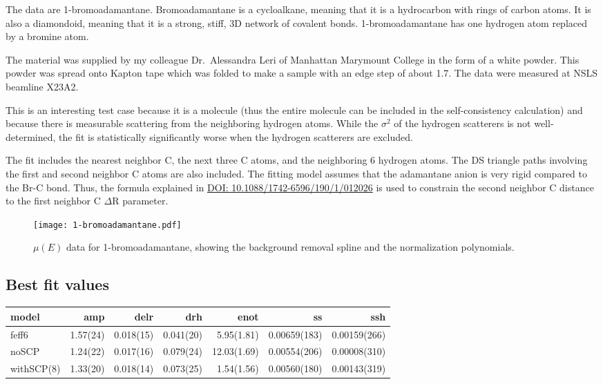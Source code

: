 \documentclass[11pt]{article}
\begin{document}
The data are 1-bromoadamantane. Bromoadamantane is a cycloalkane,
meaning that it is a hydrocarbon with rings of carbon atoms. It is
also a diamondoid, meaning that it is a strong, stiff, 3D network of
covalent bonds. 1-bromoadamantane has one hydrogen atom replaced by a
bromine atom.

The material was supplied by my colleague Dr.\ Alessandra Leri of
Manhattan Marymount College in the form of a white powder. This powder
was spread onto Kapton tape which was folded to make a sample with an
edge step of about 1.7. The data were measured at NSLS beamline X23A2.

This is an interesting test case because it is a molecule (thus the
entire molecule can be included in the self-consistency calculation)
and because there is measurable scattering from the neighboring
hydrogen atoms. While the $\sigma^2$ of the hydrogen scatterers is not
well-determined, the fit is statistically significantly worse when the
hydrogen scatterers are excluded.

The fit includes the nearest neighbor C, the next three C atoms, and
the neighboring 6 hydrogen atoms. The DS triangle paths involving the
first and second neighbor C atoms are also included. The fitting model
assumes that the adamantane anion is very rigid compared to the Br-C
bond. Thus, the formula explained in
\href{http://dx.doi.org/10.1088/1742-6596/190/1/012026}{DOI:
  10.1088/1742-6596/190/1/012026} is used to constrain the second
neighbor C distance to the first neighbor C $\Delta$R parameter.

\begin{figure}[h]
  \centering
  \texttt{[image: 1-bromoadamantane.pdf]}
  \caption{$\mu(E)$ data for 1-bromoadamantane, showing the background
    removal spline and the normalization polynomials.}
  \label{fig:bromoadamantane-data}
\end{figure}


\subsection{Best fit values}
\label{sec:orgheadline32}

\begin{center}
  \begin{tabular}{lrrrrrr}
    model & amp & delr & drh & enot & ss & ssh\\
    \hline
    feff6      & 1.57(24) & 0.018(15) & 0.041(20) &  5.95(1.81) & 0.00659(183) & 0.00159(266)\\
    noSCP      & 1.24(22) & 0.017(16) & 0.079(24) & 12.03(1.69) & 0.00554(206) & 0.00008(310)\\
    withSCP(8) & 1.33(20) & 0.018(14) & 0.073(25) &  1.54(1.56) & 0.00560(180) & 0.00143(319)\\
  \end{tabular}
\end{center}
\end{document}
